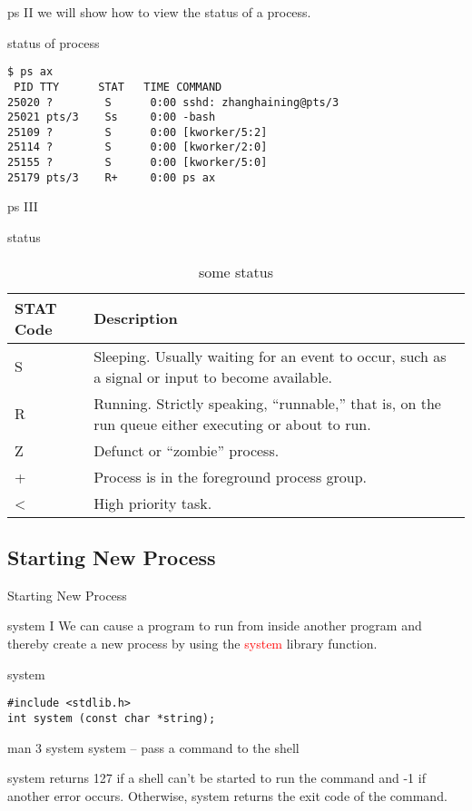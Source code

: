 \documentclass{beamer}
\begin{document}
\begin{frame}[fragile]{ps II}
we will show how to view the status of a process.
\begin{block}{status of process}
\begin{verbatim}
$ ps ax
 PID TTY      STAT   TIME COMMAND
25020 ?        S      0:00 sshd: zhanghaining@pts/3
25021 pts/3    Ss     0:00 -bash
25109 ?        S      0:00 [kworker/5:2]
25114 ?        S      0:00 [kworker/2:0]
25155 ?        S      0:00 [kworker/5:0]
25179 pts/3    R+     0:00 ps ax
\end{verbatim}
\end{block}
\end{frame}
\begin{frame}{ps III}
\begin{block}{status}
\begin{table}
\begin{tabular}{lp{20em}}
\toprule
\textbf{STAT Code}&\textbf{Description}\\
\midrule
S&Sleeping. Usually waiting for an event to occur, such as a signal or input to become available.\\
R&Running. Strictly speaking, “runnable,” that is, on the run queue either executing or about to run.\\
Z&Defunct or “zombie” process.\\
+&Process is in the foreground process group.\\
<&High priority task.\\
\bottomrule
\end{tabular}
\caption{some status}
\end{table}
\end{block}
\end{frame}
\subsection{Starting New Process}
\begin{frame}
\Huge{\centerline{Starting New Process}}
\end{frame}
\begin{frame}[fragile]{system I}
We can cause a program to run from inside another program and thereby create a new process by using the \textcolor{red}{system} library function.
\begin{block}{system}
\begin{verbatim}
#include <stdlib.h>
int system (const char *string);

\end{verbatim}
\end{block}
\begin{block}{man 3 system}
system -- pass a command to the shell
\end{block}
system returns 127 if a shell can’t be started to run the command and -1 if
another error occurs. Otherwise, system returns the exit code of the command.
\end{frame}
\end{document}
